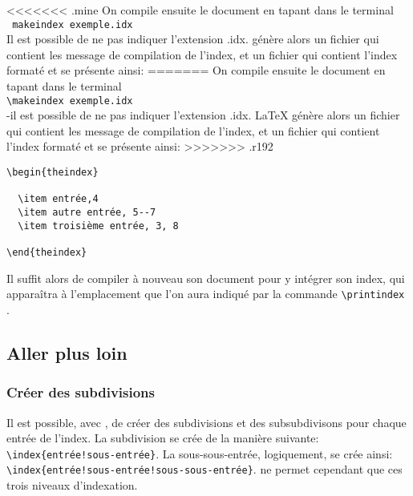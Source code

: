 <<<<<<< .mine
On compile ensuite le document en tapant dans le terminal \\ \verb+ makeindex exemple.idx + \\
Il est possible de ne pas indiquer l'extension .idx. \latex génère alors un fichier  qui contient les message de compilation de l'index, et un fichier  qui contient l'index formaté et se présente ainsi:
=======
On compile ensuite le document en tapant dans le terminal \\ \verb+\makeindex exemple.idx + \\
-il est possible de ne pas indiquer l'extension .idx. \LaTeX{} génère alors un fichier  qui contient les message de compilation de l'index, et un fichier  qui contient l'index formaté et se présente ainsi:
>>>>>>> .r192
\begin{verbatim}
\begin{theindex}

  \item entrée,4
  \item autre entrée, 5--7
  \item troisième entrée, 3, 8	

\end{theindex} 

\end{verbatim}

Il suffit alors de compiler à nouveau son document pour y intégrer son index, qui apparaîtra à l'emplacement que l'on aura indiqué par la commande  \verb|\printindex |.



\subsection{Aller plus loin}
\subsubsection{Créer des subdivisions}

Il est possible, avec ,  de créer des subdivisions et des subsubdivisons  pour chaque entrée de l'index. La subdivision se crée de la manière suivante: \verb+\index{entrée!sous-entrée}+. La sous-sous-entrée, logiquement, se crée ainsi: \verb+\index{entrée!sous-entrée!sous-sous-entrée}+.  ne permet cependant que ces trois niveaux d'indexation.

